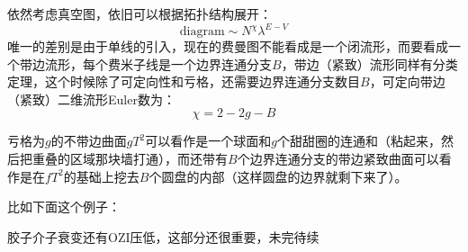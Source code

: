 依然考虑真空图，依旧可以根据拓扑结构展开：
\begin{equation}
	\mathrm{diagram}\sim N^\chi\lambda^{E-V}
\end{equation}
唯一的差别是由于单线的引入，现在的费曼图不能看成是一个闭流形，而要看成一个带边流形，每个费米子线是一个边界连通分支$B$，带边（紧致）流形同样有分类定理，这个时候除了可定向性和亏格，还需要边界连通分支数目$B$，可定向带边（紧致）二维流形Euler数为：
\begin{equation}
	\chi=2-2g-B
\end{equation}
\begin{remark}
	亏格为$g$的不带边曲面$gT^2$可以看作是一个球面和$g$个甜甜圈的连通和（粘起来，然后把重叠的区域那块墙打通），而还带有$B$个边界连通分支的带边紧致曲面可以看作是在$fT^2$的基础上挖去$B$个圆盘的内部（这样圆盘的边界就剩下来了）。
\end{remark}
比如下面这个例子：

胶子介子衰变还有OZI压低，这部分还很重要，未完待续
